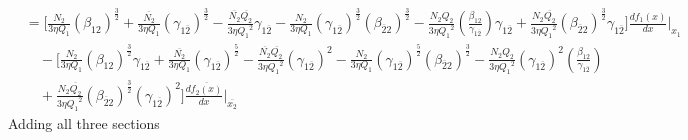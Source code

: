 \documentclass[fleqn, 10pt]{article}
\begin{document}
 \begin{equation}
 \begin{split}
     &= \Biggl[ \frac{N_2}{3 \eta Q_1} (\beta_{12})^\frac{3}{2} + \frac{\overline{N_{2}}}{3 \eta Q_1} (\gamma_{1\overline{2}})^\frac{3}{2} - \frac{\overline{N_{2}} \overline{Q_{2}}}{3 \eta {Q_1}^2} \gamma_{1\overline{2}} - \frac{N_2}{3 \eta Q_1} (\gamma_{1\overline{2}})^\frac{3}{2} (\beta_{\overline{2}2})^\frac{3}{2} - \frac{N_2 Q_2}{3 \eta {Q_1}^2} \left( \frac{\beta_{12}}{\gamma_{1\overline{2}}}\right) \gamma_{1\overline{2}} + \frac{N_2 \overline{Q_{2}}}{3 \eta {Q_1}^2} (\beta_{\overline{2}2})^\frac{3}{2} \gamma_{1\overline{2}} \Biggr]   \frac{df_1(x)}{dx} \Bigg|_{x_1} \\ & \quad - \Biggl[ \frac{N_2}{3 \eta Q_1} (\beta_{12})^\frac{3}{2} \gamma_{1\overline{2}} + \frac{\overline{N_{2}}}{3 \eta Q_1} (\gamma_{1\overline{2}})^\frac{5}{2} - \frac{\overline{N_{2}} \overline{Q_{2}}}{3 \eta {Q_1}^2} (\gamma_{1\overline{2}})^2 - \frac{N_2}{3 \eta Q_1} (\gamma_{1\overline{2}})^\frac{5}{2} (\beta_{\overline{2}2})^\frac{3}{2} - \frac{N_2 Q_2}{3 \eta {Q_1}^2} (\gamma_{1\overline{2}})^2 \left( \frac{\beta_{12}}{\gamma_{1\overline{2}}}\right) \\ & \quad +   \frac{N_2 \overline{Q_{2}}}{3 \eta {Q_1}^2} (\beta_{\overline{2}2})^\frac{3}{2} (\gamma_{1\overline{2}})^2 \Biggr] \frac{d\overline{f_{2}(x)}}{dx} \Bigg|_{\overline{x_{2}}}
     \end{split}
     \label{101}
 \end{equation}
 Adding all three sections 
\end{document}
